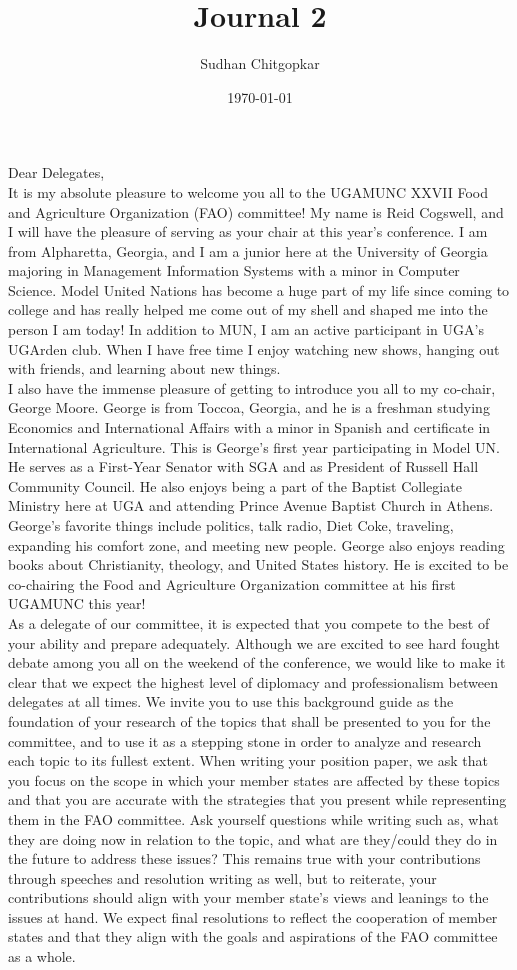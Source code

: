 \documentclass[10pt, letterpaper]{article}
\title{Journal 2}
\author{Sudhan Chitgopkar}
\date{\today}
\begin{document}
Dear Delegates, \\

It is my absolute pleasure to welcome you all to the UGAMUNC XXVII Food
and Agriculture Organization (FAO) committee! My name is Reid Cogswell,
and I will have the pleasure of serving as your chair at this year's
conference. I am from Alpharetta, Georgia, and I am a junior here at the
University of Georgia majoring in Management Information Systems with a
minor in Computer Science. Model United Nations has become a huge part
of my life since coming to college and has really helped me come out of
my shell and shaped me into the person I am today! In addition to MUN, I
am an active participant in UGA's UGArden club. When I have free time I
enjoy watching new shows, hanging out with friends, and learning about
new things. \\

I also have the immense pleasure of getting to introduce you all to my
co-chair, George Moore. George is from Toccoa, Georgia, and he is a
freshman studying Economics and International Affairs with a minor in
Spanish and certificate in International Agriculture. This is George's
first year participating in Model UN. He serves as a First-Year Senator
with SGA and as President of Russell Hall Community Council. He also
enjoys being a part of the Baptist Collegiate Ministry here at UGA and
attending Prince Avenue Baptist Church in Athens. George's favorite
things include politics, talk radio, Diet Coke, traveling, expanding his
comfort zone, and meeting new people. George also enjoys reading books
about Christianity, theology, and United States history. He is excited
to be co-chairing the Food and Agriculture Organization committee at his
first UGAMUNC this year! \\

As a delegate of our committee, it is expected that you compete to the
best of your ability and prepare adequately. Although we are excited to
see hard fought debate among you all on the weekend of the conference,
we would like to make it clear that we expect the highest level of
diplomacy and professionalism between delegates at all times. We invite
you to use this background guide as the foundation of your research of
the topics that shall be presented to you for the committee, and to use
it as a stepping stone in order to analyze and research each topic to
its fullest extent. When writing your position paper, we ask that you
focus on the scope in which your member states are affected by these
topics and that you are accurate with the strategies that you present
while representing them in the FAO committee. Ask yourself questions
while writing such as, what they are doing now in relation to the topic,
and what are they/could they do in the future to address these issues?
This remains true with your contributions through speeches and
resolution writing as well, but to reiterate, your contributions should
align with your member state's views and leanings to the issues at hand.
We expect final resolutions to reflect the cooperation of member states
and that they align with the goals and aspirations of the FAO committee
as a whole. \\
\end{document}
